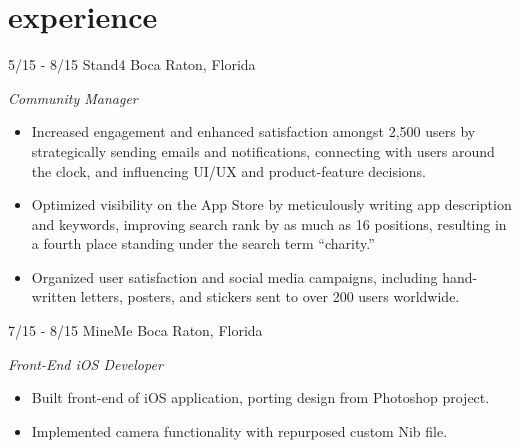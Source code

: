 \documentclass[print]{resume}
\begin{document}
\vspace{-20pt} %

\section{experience}
\begin{entrylist}

\entry
{5/15 - 8/15}
{Stand4}
{Boca Raton, Florida}
{
\emph{Community Manager}
\begin{itemize}
	\item Increased engagement and enhanced satisfaction amongst 2,500 users by 
	strategically sending emails and notifications, connecting with users around the 
	clock, and influencing UI/UX and product-feature decisions. 
	\item Optimized visibility on the App Store by meticulously writing app description 
	and keywords, improving search rank by as much as 16 positions, resulting in a fourth 
	place standing under the search term ``charity.''
	\item Organized user satisfaction and social media campaigns, including hand-written 
	letters, posters, and stickers sent to over 200 users worldwide.
\end{itemize} 
}

\entry
{7/15 - 8/15}
{MineMe}
{Boca Raton, Florida}
{
\emph{Front-End iOS Developer}
\begin{itemize}
	\item Built front-end of iOS application, porting design from Photoshop 
	project.
	\item Implemented camera functionality with repurposed custom Nib file.
\end{itemize}
}


\end{entrylist}
\end{document}
